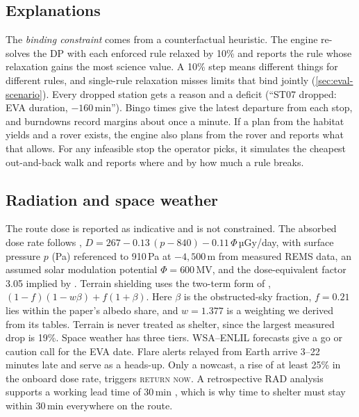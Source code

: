 \subsection{Explanations}
\label{sec:explain}
The \emph{binding constraint} comes from a counterfactual heuristic. The engine re-solves the DP with each enforced rule relaxed by 10\% and reports the rule whose relaxation gains the most science value. A 10\% step means different things for different rules, and single-rule relaxation misses limits that bind jointly (\cref{sec:eval-scenario}). Every dropped station gets a reason and a deficit (``ST07 dropped: EVA duration, $-160$\,min''). Bingo times give the latest departure from each stop, and burndowns record margins about once a minute. If a plan from the habitat yields \stayin and a rover exists, the engine also plans from the rover and reports what that allows. For any infeasible stop the operator picks, it simulates the cheapest out-and-back walk and reports where and by how much a rule breaks.

\subsection{Radiation and space weather}
\label{sec:spacewx}
The route dose is reported as indicative and is not constrained. The absorbed dose rate follows \citet{guo2015}, $D=267-0.13\,(p-840)-0.11\,\Phi$\,µGy/day, with surface pressure $p$ (Pa) referenced to 910\,Pa at $-4{,}500$\,m from measured REMS data, an assumed solar modulation potential $\Phi=600$\,MV, and the dose-equivalent factor 3.05 implied by \citet{hassler2014}. Terrain shielding uses the two-term form of \citet{guo2026}, $(1-f)(1-w\beta)+f(1+\beta)$. Here $\beta$ is the obstructed-sky fraction, $f=0.21$ lies within the paper's albedo share, and $w=1.377$ is a weighting we derived from its tables. Terrain is never treated as shelter, since the largest measured drop is 19\%. Space weather has three tiers. WSA--ENLIL forecasts give a go or caution call for the EVA date. Flare alerts relayed from Earth arrive 3--22 minutes late and serve as a heads-up. Only a nowcast, a rise of at least 25\% in the onboard dose rate, triggers \textsc{return now}. A retrospective RAD analysis supports a working lead time of 30\,min \citep{lowe2025nowcast}, which is why time to shelter must stay within 30\,min everywhere on the route.

